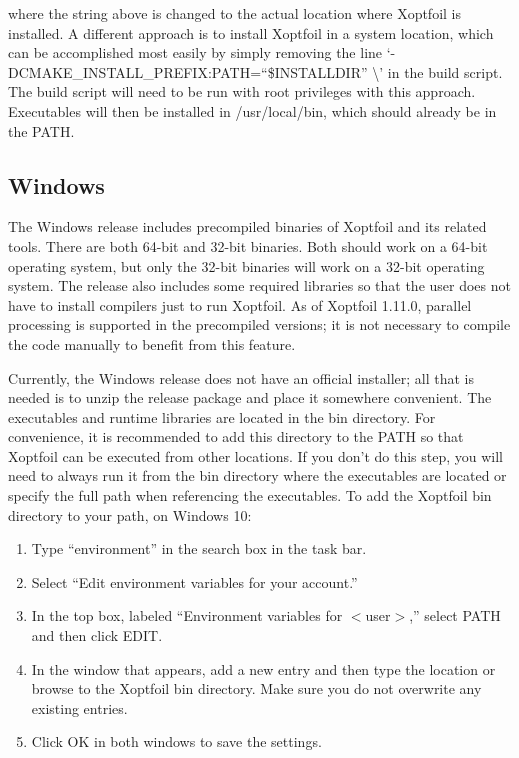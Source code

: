 \documentclass[11pt]{article}
\begin{document}
\noindent where the string above is changed to the actual location where Xoptfoil is
installed. A different approach is to install Xoptfoil in a system location, which can be
accomplished most easily by simply removing the line
`-DCMAKE\_INSTALL\_PREFIX:PATH=``\$INSTALLDIR'' \textbackslash' in the build script. The
build script will need to be run with root privileges with this approach. Executables will
then be installed in /usr/local/bin, which should already be in the PATH.

\subsection{Windows}\label{sec:install_windows}

The Windows release includes precompiled binaries of Xoptfoil and its related tools. There
are both 64-bit and 32-bit binaries. Both should work on a 64-bit operating system, but
only the 32-bit binaries will work on a 32-bit operating system.  The release also
includes some required libraries so that the user does not have to install compilers just
to run Xoptfoil. As of Xoptfoil 1.11.0, parallel processing is supported in the
precompiled versions; it is not necessary to compile the code manually to benefit from
this feature.

Currently, the Windows release does not have an official installer; all that is needed is
to unzip the release package and place it somewhere convenient. The executables and
runtime libraries are located in the bin directory. For convenience, it is recommended to
add this directory to the PATH so that Xoptfoil can be executed from other locations. If
you don't do this step, you will need to always run it from the bin directory where the
executables are located or specify the full path when referencing the executables.
To add the Xoptfoil bin directory to your path, on Windows 10:

\begin{enumerate}
  \item{Type ``environment'' in the search box in the task bar.}
  \item{Select ``Edit environment variables for your account.''}
  \item{In the top box, labeled ``Environment variables for $<$user$>$,'' select PATH and
then click EDIT.}
  \item{In the window that appears, add a new entry and then type the location or browse to
the Xoptfoil bin directory. Make sure you do not overwrite any existing entries.}
  \item{Click OK in both windows to save the settings.}
\end{enumerate}
\end{document}
